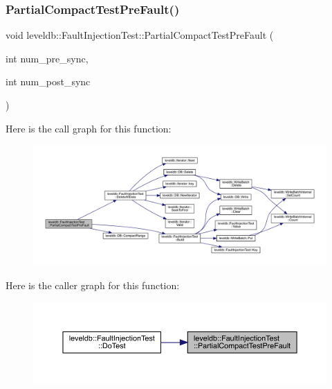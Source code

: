 \subsubsection{\texorpdfstring{PartialCompactTestPreFault()}{PartialCompactTestPreFault()}}
{\footnotesize\ttfamily void leveldb\+::\+Fault\+Injection\+Test\+::\+Partial\+Compact\+Test\+Pre\+Fault (\begin{DoxyParamCaption}\item[{int}]{num\+\_\+pre\+\_\+sync,  }\item[{int}]{num\+\_\+post\+\_\+sync }\end{DoxyParamCaption})\hspace{0.3cm}{\ttfamily [inline]}}

Here is the call graph for this function\+:
\nopagebreak
\begin{figure}[H]
\begin{center}
\leavevmode
\includegraphics[width=350pt]{classleveldb_1_1_fault_injection_test_a9a3c0876a2caae54ccbae754794f262c_cgraph}
\end{center}
\end{figure}
Here is the caller graph for this function\+:
\nopagebreak
\begin{figure}[H]
\begin{center}
\leavevmode
\includegraphics[width=350pt]{classleveldb_1_1_fault_injection_test_a9a3c0876a2caae54ccbae754794f262c_icgraph}
\end{center}
\end{figure}
\mbox{\label{classleveldb_1_1_fault_injection_test_aba1c6ef251ae09ce32acb3a16e2c0004}} 
